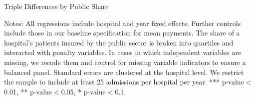 \documentclass[12pt]{article}
\begin{document}
\newpage
{}
\setlength{\captionmargin}{.5 \textwidth} \addtolength{\captionmargin}{-.5\wd\gfxbox}
\begin{table}[htbp!]
\centering
\caption{Triple Differences by Public Share}
\label{tab:publicshare}
\usebox{\gfxbox}
\par
\begin{minipage}{\wd\gfxbox}
\footnotesize
Notes: All regressions include hospital and year fixed effects.  Further controls include those in our baseline specification for mean payments.  The share of a hospital's patients insured by the public sector is broken into quartiles and interacted with penalty variables.  In cases in which independent variables are missing, we recode them and control for missing variable indicators to ensure a balanced panel.  Standard errors are clustered at the hospital level.  We restrict the sample to include at least 25 admissions per hospital per year.  *** p-value$<$0.01, ** p-value$<$0.05, * p-value$<$0.1.
\end{minipage}
\end{table}
\end{document}
